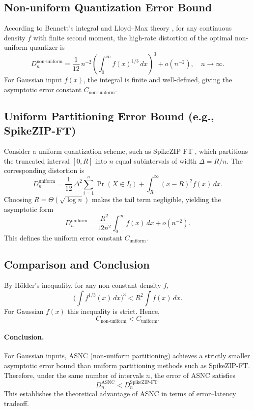 \documentclass{article}
\theoremstyle{plain}
\theoremstyle{definition}
\theoremstyle{remark}
\begin{document}
\subsection{Non-uniform Quantization Error Bound}
According to Bennett's integral and Lloyd–Max theory \citep{gersho1992vector}, for any continuous density $f$ with finite second moment, the high-rate distortion of the optimal non-uniform quantizer is
\[
D_n^{\text{non-uniform}}
= \frac{1}{12}\,n^{-2}\left(\int_{0}^{\infty} f(x)^{1/3}\,dx\right)^3 + o(n^{-2}), \quad n \to \infty.
\]
For Gaussian input $f(x)$, the integral is finite and well-defined, giving the asymptotic error constant $C_{\text{non-uniform}}$.

\subsection{Uniform Partitioning Error Bound (e.g., SpikeZIP-FT)}
Consider a uniform quantization scheme, such as SpikeZIP-FT \citep{you2024spikeziptf}, which partitions the truncated interval $[0,R]$ into $n$ equal subintervals of width $\Delta = R/n$.  
The corresponding distortion is
\[
D_n^{\text{uniform}} 
= \frac{1}{12}\,\Delta^2 \sum_{i=1}^n \Pr(X \in I_i) 
   + \int_{R}^{\infty} (x-R)^2 f(x)\,dx .
\]
Choosing $R = \Theta(\sqrt{\log n})$ makes the tail term negligible, yielding the asymptotic form
\[
D_n^{\text{uniform}} 
= \frac{R^2}{12n^2}\int_{0}^{\infty} f(x)\,dx + o(n^{-2}).
\]
This defines the uniform error constant $C_{\text{uniform}}$.

\subsection{Comparison and Conclusion}
By Hölder’s inequality, for any non-constant density $f$, 
\[
\Big(\int f^{1/3}(x)\,dx\Big)^3 < R^2 \int f(x)\,dx .
\]
For Gaussian $f(x)$ this inequality is strict. Hence,
\[
C_{\text{non-uniform}} < C_{\text{uniform}}.
\]

\paragraph{Conclusion.}  
For Gaussian inputs, ASNC (non-uniform partitioning) achieves a strictly smaller asymptotic error bound than uniform partitioning methods such as SpikeZIP-FT. Therefore, under the same number of intervals $n$, the error of ASNC satisfies
\[
D_n^{\text{ASNC}} < D_n^{\text{SpikeZIP-FT}} .
\]
This establishes the theoretical advantage of ASNC in terms of error–latency tradeoff.
\end{document}
